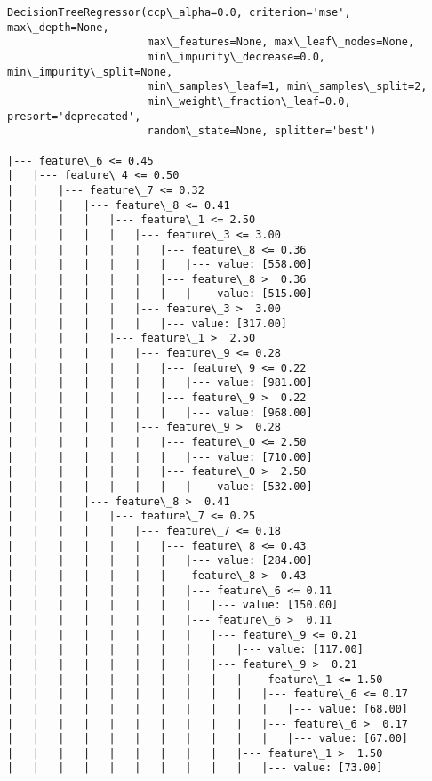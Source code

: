 \documentclass[11pt]{article}
\begin{document}
    \begin{Verbatim}[commandchars=\\\{\}]
DecisionTreeRegressor(ccp\_alpha=0.0, criterion='mse', max\_depth=None,
                      max\_features=None, max\_leaf\_nodes=None,
                      min\_impurity\_decrease=0.0, min\_impurity\_split=None,
                      min\_samples\_leaf=1, min\_samples\_split=2,
                      min\_weight\_fraction\_leaf=0.0, presort='deprecated',
                      random\_state=None, splitter='best')

|--- feature\_6 <= 0.45
|   |--- feature\_4 <= 0.50
|   |   |--- feature\_7 <= 0.32
|   |   |   |--- feature\_8 <= 0.41
|   |   |   |   |--- feature\_1 <= 2.50
|   |   |   |   |   |--- feature\_3 <= 3.00
|   |   |   |   |   |   |--- feature\_8 <= 0.36
|   |   |   |   |   |   |   |--- value: [558.00]
|   |   |   |   |   |   |--- feature\_8 >  0.36
|   |   |   |   |   |   |   |--- value: [515.00]
|   |   |   |   |   |--- feature\_3 >  3.00
|   |   |   |   |   |   |--- value: [317.00]
|   |   |   |   |--- feature\_1 >  2.50
|   |   |   |   |   |--- feature\_9 <= 0.28
|   |   |   |   |   |   |--- feature\_9 <= 0.22
|   |   |   |   |   |   |   |--- value: [981.00]
|   |   |   |   |   |   |--- feature\_9 >  0.22
|   |   |   |   |   |   |   |--- value: [968.00]
|   |   |   |   |   |--- feature\_9 >  0.28
|   |   |   |   |   |   |--- feature\_0 <= 2.50
|   |   |   |   |   |   |   |--- value: [710.00]
|   |   |   |   |   |   |--- feature\_0 >  2.50
|   |   |   |   |   |   |   |--- value: [532.00]
|   |   |   |--- feature\_8 >  0.41
|   |   |   |   |--- feature\_7 <= 0.25
|   |   |   |   |   |--- feature\_7 <= 0.18
|   |   |   |   |   |   |--- feature\_8 <= 0.43
|   |   |   |   |   |   |   |--- value: [284.00]
|   |   |   |   |   |   |--- feature\_8 >  0.43
|   |   |   |   |   |   |   |--- feature\_6 <= 0.11
|   |   |   |   |   |   |   |   |--- value: [150.00]
|   |   |   |   |   |   |   |--- feature\_6 >  0.11
|   |   |   |   |   |   |   |   |--- feature\_9 <= 0.21
|   |   |   |   |   |   |   |   |   |--- value: [117.00]
|   |   |   |   |   |   |   |   |--- feature\_9 >  0.21
|   |   |   |   |   |   |   |   |   |--- feature\_1 <= 1.50
|   |   |   |   |   |   |   |   |   |   |--- feature\_6 <= 0.17
|   |   |   |   |   |   |   |   |   |   |   |--- value: [68.00]
|   |   |   |   |   |   |   |   |   |   |--- feature\_6 >  0.17
|   |   |   |   |   |   |   |   |   |   |   |--- value: [67.00]
|   |   |   |   |   |   |   |   |   |--- feature\_1 >  1.50
|   |   |   |   |   |   |   |   |   |   |--- value: [73.00]

\end{Verbatim}
\end{document}
